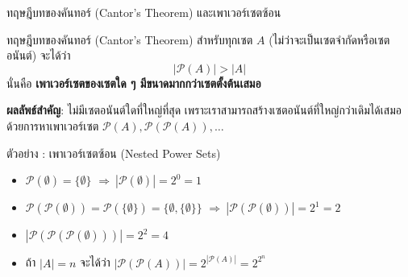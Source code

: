 \begin{frame}{ทฤษฎีบทของคันทอร์ (Cantor's Theorem) และเพาเวอร์เซตซ้อน}
  \begin{block}{ทฤษฎีบทของคันทอร์ (Cantor's Theorem)}
    สำหรับทุกเซต $A$ (ไม่ว่าจะเป็นเซตจำกัดหรือเซตอนันต์) จะได้ว่า
    \[ |\mathcal{P}(A)| > |A| \]
    นั่นคือ \textbf{เพาเวอร์เซตของเซตใด ๆ มีขนาดมากกว่าเซตตั้งต้นเสมอ}
  \end{block}
  \vspace{0.2em}
  \textbf{ผลลัพธ์สำคัญ}: ไม่มีเซตอนันต์ใดที่ใหญ่ที่สุด เพราะเราสามารถสร้างเซตอนันต์ที่ใหญ่กว่าเดิมได้เสมอด้วยการหาเพาเวอร์เซต $\mathcal{P}(A), \mathcal{P}(\mathcal{P}(A)), \ldots$
  \vspace{0.2em}
  \begin{exampleblock}{ตัวอย่าง : เพาเวอร์เซตซ้อน (Nested Power Sets)}
    \begin{itemize}\small
      \item $\mathcal{P}(\emptyset) = \{\emptyset\}$ \quad $\Rightarrow\ |\mathcal{P}(\emptyset)| = 2^0 = 1$
      \item $\mathcal{P}(\mathcal{P}(\emptyset)) = \mathcal{P}(\{\emptyset\}) = \{\emptyset, \{\emptyset\}\}$ \quad $\Rightarrow\ |\mathcal{P}(\mathcal{P}(\emptyset))| = 2^1 = 2$
      \item $|\mathcal{P}(\mathcal{P}(\mathcal{P}(\emptyset)))| = 2^2 = 4$
      \item ถ้า $|A| = n$ จะได้ว่า $|\mathcal{P}(\mathcal{P}(A))| = 2^{|\mathcal{P}(A)|} = 2^{2^n}$
    \end{itemize}
  \end{exampleblock}
\end{frame}

